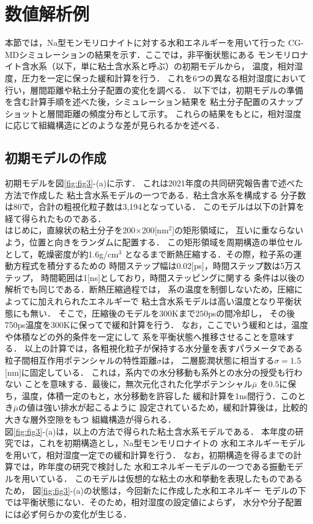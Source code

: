 \section{数値解析例}
本節では，Na型モンモリロナイトに対する水和エネルギーを用いて行った
CG-MDシミュレーションの結果を示す．ここでは，非平衡状態にある
モンモリロナイト含水系（以下，単に粘土含水系と呼ぶ）の初期モデルから，
温度，相対湿度，圧力を一定に保った緩和計算を行う．
これを6つの異なる相対湿度において行い，層間距離や粘土分子配置の変化を調べる．
以下では，初期モデルの準備を含む計算手順を述べた後，シミュレーション結果を
粘土分子配置のスナップショットと層間距離の頻度分布として示す。
これらの結果をもとに，相対湿度に応じて組織構造にどのような差が見られるかを述べる．
\subsection{初期モデルの作成}
初期モデルを図\ref{fig:fig3}-(a)に示す．
これは2021年度の共同研究報告書で述べた方法で作成した
粘土含水系モデルの一つである．粘土含水系を構成する
分子数は80で，合計の粗視化粒子数は3,194となっている．
このモデルは以下の計算を経て得られたものである．\\
\hspace{\parindent}
はじめに，直線状の粘土分子を200$\times$200[nm$^2$]の矩形領域に，
互いに重ならないよう，位置と向きをランダムに配置する．
この矩形領域を周期構造の単位セルとして，乾燥密度が約1.6g/cm$^{3}$
となるまで断熱圧縮する．その際，粒子系の運動方程式を積分するための
時間ステップ幅は0.02[ps]，時間ステップ数は5万ステップ，
時間範囲は1[ns]としており，時間ステッピングに関する
条件は以後の解析でも同じである．断熱圧縮過程では，
系の温度を制御しないため，圧縮によってに加えれられたエネルギーで
粘土含水系モデルは高い温度となり平衡状態にも無い．
そこで，圧縮後のモデルを300Kまで$250$psの間冷却し，
その後750ps温度を300Kに保ってで緩和計算を行う．
なお，ここでいう緩和とは，温度や体積などの外的条件を一定にして
系を平衡状態へ推移させることを意味する．
以上の計算では，各粗視化粒子が保持する水分量を表すパラメータである
粒子間相互作用ポテンシャルの特性距離$\sigma$は，
二層膨潤状態に相当する$\sigma=1.5$[nm]に固定している．
これは，系内での水分移動も系外との水分の授受も行わない
ことを意味する．最後に，無次元化された化学ポテンシャル$\bar \mu$
を$0.5$に保ち，温度，体積一定のもと，水分移動を許容した
緩和計算を1ns間行う．このとき$\bar \mu$の値は強い排水が起こるように
設定されているため，緩和計算後は，比較的大きな層外空隙をもつ
組織構造が得られる．\\
\hspace{\parindent}
図\ref{fig:fig3}-(a)は，以上の方法で得られた粘土含水系モデルである．
本年度の研究では，これを初期構造とし，Na型モンモリロナイトの
水和エネルギーモデルを用いて，相対湿度一定での緩和計算を行う．
なお，初期構造を得るまでの計算では，昨年度の研究で検討した
水和エネルギーモデルの一つである振動モデルを用いている．
このモデルは仮想的な粘土の水和挙動を表現したものであるため，
図\ref{fig:fig3}-(a)の状態は，今回新たに作成した水和エネルギー
モデルの下では平衡状態にない．そのため，相対湿度の設定値によらず，
水分や分子配置には必ず何らかの変化が生じる．
